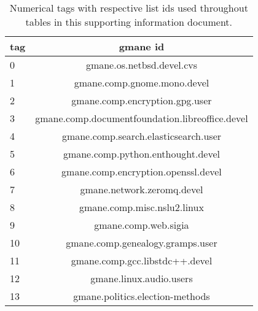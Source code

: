 \begin{table}[h!]
\begin{center}
\begin{tabular}{| l | c |}\hline
tag & gmane id \\\hline
0 & gmane.os.netbsd.devel.cvs \\\hline
1 & gmane.comp.gnome.mono.devel \\\hline
2 & gmane.comp.encryption.gpg.user \\\hline
3 & gmane.comp.documentfoundation.libreoffice.devel \\\hline
4 & gmane.comp.search.elasticsearch.user \\\hline
5 & gmane.comp.python.enthought.devel \\\hline
6 & gmane.comp.encryption.openssl.devel \\\hline
7 & gmane.network.zeromq.devel \\\hline
8 & gmane.comp.misc.nslu2.linux \\\hline
9 & gmane.comp.web.sigia \\\hline
10 & gmane.comp.genealogy.gramps.user \\\hline
11 & gmane.comp.gcc.libstdc++.devel \\\hline
12 & gmane.linux.audio.users \\\hline
13 & gmane.politics.election-methods \\\hline
\end{tabular}
\caption{Numerical tags with respective list ids used throughout tables in this supporting information document.}
\end{center}
\end{table}